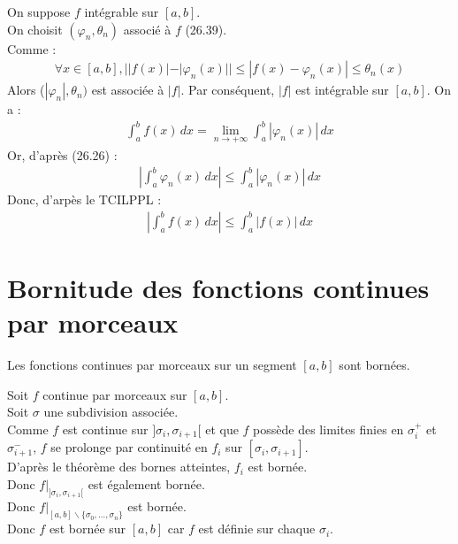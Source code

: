 \documentclass[../main.tex]{subfiles}
\begin{document}
\noindent On suppose $f$ intégrable sur $[a, b]$. \\
On choisit $(\varphi_n, \theta_n)$ associé à $f$ (26.39). \\
Comme : 
\begin{align*}
    \forall x\in [a, b], ||f(x)| - |\varphi_n(x)|| \leq |f(x) - \varphi_n(x)| \leq \theta_n(x)
\end{align*}
Alors ($|\varphi_n|, \theta_n)$ est associée à $|f|$. Par conséquent, $|f|$ est intégrable sur $[a, b]$. On a : 
\begin{align*}
    \int_{a}^{b} f(x) \,dx = \lim_{n\to +\infty} \int_{a}^{b} |\varphi_n(x)| \,dx
\end{align*}
Or, d'après (26.26) :
\begin{align*}
    \left| \int_{a}^{b} \varphi_n(x) \,dx \right| \leq \int_{a}^{b} |\varphi_n(x)| \,dx
\end{align*}
Donc, d'arpès le TCILPPL : 
\begin{align*}
    \left| \int_{a}^{b} f(x) \,dx \right| \leq \int_{a}^{b} |f(x)| \,dx
\end{align*}

\section{Bornitude des fonctions continues par morceaux}
\begin{tcolorbox}[title=Propostion 26.56, title filled=false, colframe=lightblue, colback=lightblue!10!white]
    Les fonctions continues par morceaux sur un segment $[a, b]$ sont bornées.
\end{tcolorbox}

\noindent Soit $f$ continue par morceaux sur $[a, b]$. \\
Soit $\sigma$ une subdivision associée. \\
Comme $f$ est continue sur $]\sigma_i, \sigma_{i+1}[$ et que $f$ possède des limites finies en $\sigma_i^+$ et $\sigma_{i+1}^-$, $f$ se prolonge par continuité en $f_i$ sur $[\sigma_i, \sigma_{i+1}]$. \\
D'après le théorème des bornes atteintes, $f_i$ est bornée. \\
Donc $\left. f \right|_{]\sigma_i, \sigma_{i+1}[}$ est également bornée. \\
Donc $\left. f \right|_{[a, b] \backslash \{\sigma_0, \ldots, \sigma_n\}}$ est bornée. \\
Donc $f$ est bornée sur $[a, b]$ car $f$ est définie sur chaque $\sigma_i$. 
\end{document}

